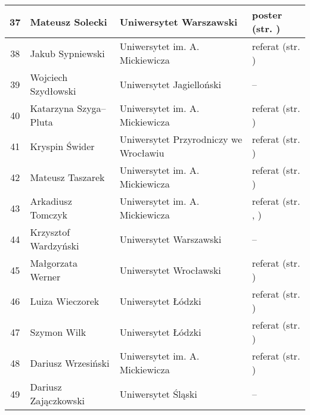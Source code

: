 \documentclass[12pt,oneside]{book}
\begin{document}
\begin{tabular}{||c|l|l|l||}
37	 & Mateusz Solecki & Uniwersytet Warszawski & poster (str. \pageref{solecki}) \\\hline	
38	 & Jakub Sypniewski & Uniwersytet im. A. Mickiewicza & referat (str. \pageref{sypniewski}) \\\hline
39	 & Wojciech Szydłowski & Uniwersytet Jagielloński & -- \\\hline
40	 & Katarzyna Szyga--Pluta & Uniwersytet im. A. Mickiewicza & referat (str. \pageref{kendzierski}) \\\hline
41	 & Kryspin Świder & Uniwersytet Przyrodniczy we Wrocławiu & referat (str. \pageref{swider}) \\\hline
42	 & Mateusz Taszarek & Uniwersytet im. A. Mickiewicza & referat (str. \pageref{taszarek}) \\\hline
43	 & Arkadiusz Tomczyk & Uniwersytet im. A. Mickiewicza & referat (str. \pageref{kendzierski}, \pageref{ptak}) \\\hline
44	 & Krzysztof Wardzyński & Uniwersytet Warszawski & -- \\\hline
45   & Małgorzata Werner & Uniwersytet Wrocławski & referat (str. \pageref{bilinska})  \\\hline
46   & Luiza Wieczorek & Uniwersytet Łódzki & referat (str. \pageref{wieczorek}) \\\hline
47   & Szymon Wilk & Uniwersytet Łódzki & referat (str. \pageref{wilk}) \\\hline
48   & Dariusz Wrzesiński & Uniwersytet im. A. Mickiewicza & referat (str. \pageref{ptak}) \\\hline
49   & Dariusz Zajączkowski & Uniwersytet Śląski & -- \\\hline
\hline
\hline
\end{tabular}


\printindex[a]
%


\backmatter



%
\end{document}
